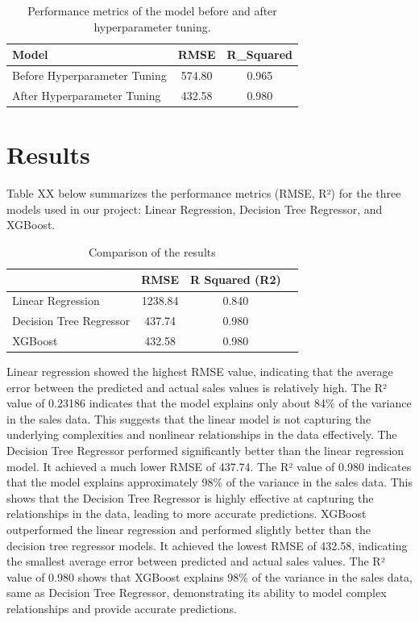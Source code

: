 \documentclass[12pt]{report}
\begin{document}
\begin{table}[H] %
    \centering
    \begin{tabular}{|l|c|c|}
        \hline
        \textbf{Model} & \textbf{RMSE} & \textbf{R\_Squared} \\
        \hline
        Before Hyperparameter Tuning & 574.80 & 0.965 \\
        \hline
        After Hyperparameter Tuning & 432.58 & 0.980 \\
        \hline
    \end{tabular}
    \caption{Performance metrics of the model before and after hyperparameter tuning.}
    \label{tab:model_performance}
\end{table}





\chapter{Results}
Table XX below summarizes the performance metrics (RMSE, R²) for the three models used in our project: Linear Regression, Decision Tree Regressor, and XGBoost.

\begin{table}[h]
    \centering
    \begin{tabular}{|l|c|c|p{5cm}|} 
        \hline
        \textbf{ } & \textbf{RMSE} & \textbf{R Squared (R2)}  \\
        \hline
        Linear Regression & 1238.84 & 0.840  \\
        \hline
        Decision Tree Regressor & 437.74 & 0.980 \\
        \hline
        XGBoost & 432.58 & 0.980 \\
        \hline
  
    \end{tabular}
    \caption{Comparison of the results}
\end{table}

Linear regression showed the highest RMSE value, indicating that the average error between the predicted and actual sales values is relatively high. The R² value of 0.23186 indicates that the model explains only about 84\% of the variance in the sales data. This suggests that the linear model is not capturing the underlying complexities and nonlinear relationships in the data effectively. The Decision Tree Regressor performed significantly better than the linear regression model. It achieved a much lower RMSE of 437.74. The R² value of 0.980 indicates that the model explains approximately 98\% of the variance in the sales data. This shows that the Decision Tree Regressor is highly effective at capturing the relationships in the data, leading to more accurate predictions. XGBoost outperformed the linear regression and performed slightly better than the decision tree regressor models. It achieved the lowest RMSE of 432.58, indicating the smallest average error between predicted and actual sales values. The R² value of 0.980 shows that XGBoost explains 98\% of the variance in the sales data, same as Decision Tree Regressor, demonstrating its ability to model complex relationships and provide accurate predictions.
\end{document}
